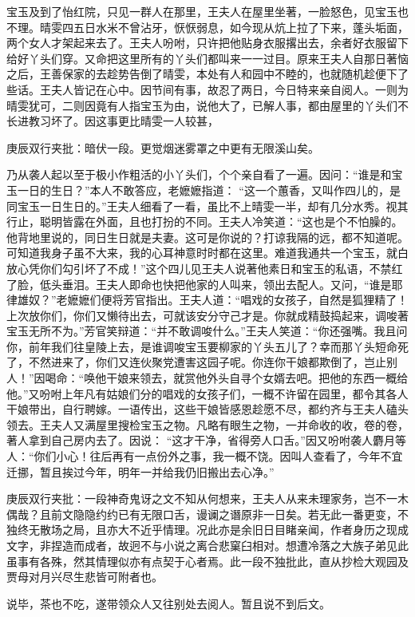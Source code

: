 \begin{parag}
    宝玉及到了怡红院，只见一群人在那里，王夫人在屋里坐著，一脸怒色，见宝玉也不理。晴雯四五日水米不曾沾牙，恹恹弱息，如今现从炕上拉了下来，蓬头垢面，两个女人才架起来去了。王夫人吩咐，只许把他贴身衣服撂出去，余者好衣服留下给好丫头们穿。又命把这里所有的丫头们都叫来一一过目。原来王夫人自那日著恼之后，王善保家的去趁势告倒了晴雯，本处有人和园中不睦的，也就随机趁便下了些话。王夫人皆记在心中。因节间有事，故忍了两日，今日特来亲自阅人。一则为晴雯犹可，二则因竟有人指宝玉为由，说他大了，已解人事，都由屋里的丫头们不长进教习坏了。因这事更比晴雯一人较甚，\begin{note}庚辰双行夹批：暗伏一段。更觉烟迷雾罩之中更有无限溪山矣。\end{note}乃从袭人起以至于极小作粗活的小丫头们，个个亲自看了一遍。因问：“谁是和宝玉一日的生日？”本人不敢答应，老嬷嬷指道： “这一个蕙香，又叫作四儿的，是同宝玉一日生日的。”王夫人细看了一看，虽比不上晴雯一半，却有几分水秀。视其行止，聪明皆露在外面，且也打扮的不同。王夫人冷笑道：“这也是个不怕臊的。他背地里说的，同日生日就是夫妻。这可是你说的？打谅我隔的远，都不知道呢。可知道我身子虽不大来，我的心耳神意时时都在这里。难道我通共一个宝玉，就白放心凭你们勾引坏了不成！”这个四儿见王夫人说著他素日和宝玉的私语，不禁红了脸，低头垂泪。王夫人即命也快把他家的人叫来，领出去配人。又问，“谁是耶律雄奴？”老嬷嬷们便将芳官指出。王夫人道：“唱戏的女孩子，自然是狐狸精了！上次放你们，你们又懒待出去，可就该安分守己才是。你就成精鼓捣起来，调唆著宝玉无所不为。”芳官笑辩道：“并不敢调唆什么。”王夫人笑道：“你还强嘴。我且问你，前年我们往皇陵上去，是谁调唆宝玉要柳家的丫头五儿了？幸而那丫头短命死了，不然进来了，你们又连伙聚党遭害这园子呢。你连你干娘都欺倒了，岂止别人！”因喝命：“唤他干娘来领去，就赏他外头自寻个女婿去吧。把他的东西一概给他。”又吩咐上年凡有姑娘们分的唱戏的女孩子们，一概不许留在园里，都令其各人干娘带出，自行聘嫁。一语传出，这些干娘皆感恩趁愿不尽，都约齐与王夫人磕头领去。王夫人又满屋里搜检宝玉之物。凡略有眼生之物，一并命收的收，卷的卷，著人拿到自己房内去了。因说： “这才干净，省得旁人口舌。”因又吩咐袭人麝月等人：“你们小心！往后再有一点份外之事，我一概不饶。因叫人查看了，今年不宜迁挪，暂且挨过今年，明年一并给我仍旧搬出去心净。”\begin{note}庚辰双行夹批：一段神奇鬼讶之文不知从何想来，王夫人从来未理家务，岂不一木偶哉？且前文隐隐约约已有无限口舌，谩谰之谮原非一日矣。若无此一番更变，不独终无散场之局，且亦大不近乎情理。况此亦是余旧日目睹亲闻，作者身历之现成文字，非捏造而成者，故迥不与小说之离合悲窠臼相对。想遭冷落之大族子弟见此虽事有各殊，然其情理似亦有点契于心者焉。此一段不独批此，直从抄检大观园及贾母对月兴尽生悲皆可附者也。\end{note}说毕，茶也不吃，遂带领众人又往别处去阅人。暂且说不到后文。
\end{parag}


